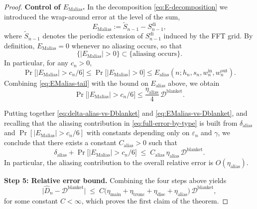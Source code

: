 \documentclass{article}
\theoremstyle{plain}
\theoremstyle{definition}
\begin{document}
\begin{proof}
\medskip

\textbf{Control of $E_{\mathrm{Malias}}$.}
In the decomposition \eqref{eq:E-decomposition} we introduced the
wrap-around error at the level of the sum,
\[
  E_{\mathrm{Malias}}
  :=
  \widetilde S_{n-1} - S_{n-1}^{\mathrm{di}},
\]
where $\widetilde S_{n-1}$ denotes the periodic extension of
$S_{n-1}^{\mathrm{di}}$ induced by the FFT grid.
By definition, $E_{\mathrm{Malias}}=0$ whenever no aliasing occurs, so
that
\[
  \bigl\{|E_{\mathrm{Malias}}|>0\bigr\}
  \subset
  \bigl\{\text{aliasing occurs}\bigr\}.
\]
In particular, for any $c_n > 0$,
\begin{equation}
  \label{eq:EMalias-tail}
  \Pr\bigl[|E_{\mathrm{Malias}}|>c_n/6\bigr]
  \le
  \Pr\bigl[|E_{\mathrm{Malias}}|>0\bigr]
  \le
  E_{\mathrm{alias}}(n;h_n,s_n,w_n^{\mathrm{in}},w_n^{\mathrm{out}}).
\end{equation}
Combining \eqref{eq:EMalias-tail} with the bound on
$E_{\mathrm{alias}}$ above, we obtain
\begin{equation}
  \label{eq:EMalias-vs-Dblanket}
  \Pr\bigl[|E_{\mathrm{Malias}}|>c_n/6\bigr]
  \le
  \frac{\eta_{\mathrm{alias}}}{4}\,\mathcal{D}^{\mathrm{blanket}}. %
\end{equation}

\medskip

Putting together \eqref{eq:delta-alias-vs-Dblanket} and
\eqref{eq:EMalias-vs-Dblanket}, and recalling that the aliasing
contribution in \eqref{eq:full-error-by-type} is built from
$\delta_{\mathrm{alias}}$ and $\Pr[|E_{\mathrm{Malias}}|>c_n/6]$ with
constants depending only on $\varepsilon_n$ and $\gamma$, we conclude
that there exists a constant $C_{\mathrm{alias}}>0$ such that
\[
  \delta_{\mathrm{alias}}
  +
  \Pr\bigl[|E_{\mathrm{Malias}}|>c_n/6\bigr]
  \;\le\;
  C_{\mathrm{alias}}\,
  \eta_{\mathrm{alias}}\,
  \mathcal{D}^{\mathrm{blanket}}. %
\]
In particular, the aliasing contribution to the overall relative error
is $O(\eta_{\mathrm{alias}})$.


\medskip
\noindent
\textbf{Step 5: Relative error bound.}
Combining the four steps above yields 
\[
  \bigl|
    \widehat D_n - \mathcal{D}^{\mathrm{blanket}}
  \bigr|
  \;\le\;
  C\bigl(
    \eta_{\mathrm{main}}
    + \eta_{\mathrm{trunc}}
    + \eta_{\mathrm{disc}}
    + \eta_{\mathrm{alias}}
  \bigr)\,\mathcal{D}^{\mathrm{blanket}},
\]
for some constant $C<\infty$, which proves the first claim of the theorem.

\medskip


\end{proof}
\end{document}
